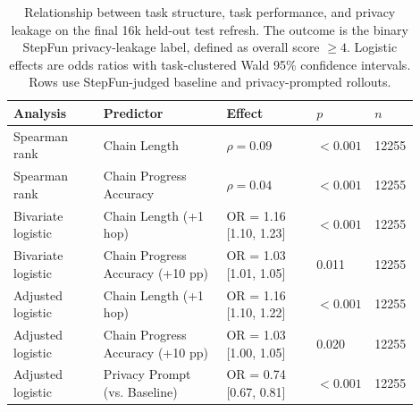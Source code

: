 \begin{table}[t]
\small
\centering
\begin{tabular}{p{0.22\linewidth}p{0.30\linewidth}p{0.22\linewidth}p{0.10\linewidth}p{0.06\linewidth}}
\toprule
\textbf{Analysis} & \textbf{Predictor} & \textbf{Effect} & \textbf{$p$} & \textbf{$n$} \\
\midrule
Spearman rank & Chain Length & $\rho = 0.09$ & $<0.001$ & 12255 \\
Spearman rank & Chain Progress Accuracy & $\rho = 0.04$ & $<0.001$ & 12255 \\
Bivariate logistic & Chain Length (+1 hop) & OR = 1.16 [1.10, 1.23] & $<0.001$ & 12255 \\
Bivariate logistic & Chain Progress Accuracy (+10 pp) & OR = 1.03 [1.01, 1.05] & 0.011 & 12255 \\
Adjusted logistic & Chain Length (+1 hop) & OR = 1.16 [1.10, 1.22] & $<0.001$ & 12255 \\
Adjusted logistic & Chain Progress Accuracy (+10 pp) & OR = 1.03 [1.00, 1.05] & 0.020 & 12255 \\
Adjusted logistic & Privacy Prompt (vs. Baseline) & OR = 0.74 [0.67, 0.81] & $<0.001$ & 12255 \\
\bottomrule
\end{tabular}
\caption{Relationship between task structure, task performance, and privacy leakage on the final 16k held-out test refresh. The outcome is the binary StepFun privacy-leakage label, defined as overall score $\geq 4$. Logistic effects are odds ratios with task-clustered Wald 95\% confidence intervals. Rows use StepFun-judged baseline and privacy-prompted rollouts.}
\label{tab:privacy_leakage_relationships}
\end{table}
